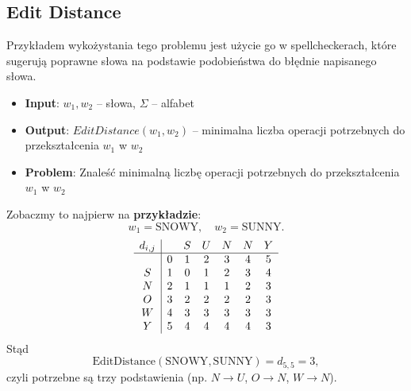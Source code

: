 \documentclass[11pt,a4paper]{article}
\begin{document}
\subsection{Edit Distance}
Przykładem wykożystania tego problemu jest użycie go w spellcheckerach, które sugerują poprawne słowa na podstawie podobieństwa do błędnie napisanego słowa.
\begin{itemize}
    \item \textbf{Input}: $w_1, w_2$ -- słowa, $\Sigma$ -- alfabet
    \item \textbf{Output}: $EditDistance(w_1, w_2)$ -- minimalna liczba operacji potrzebnych do przekształcenia $w_1$ w $w_2$
    \item \textbf{Problem}: Znaleść minimalną liczbę operacji potrzebnych do przekształcenia $w_1$ w $w_2$
\end{itemize}
Zobaczmy to najpierw na \textbf{przykładzie}:
\[
w_1=\text{SNOWY},\quad w_2=\text{SUNNY}.
\]
\[
\begin{array}{c|cccccc}
d_{i,j} &   & S & U & N & N & Y \\\hline
        & 0 & 1 & 2 & 3 & 4 & 5 \\
S       & 1 & 0 & 1 & 2 & 3 & 4 \\
N       & 2 & 1 & 1 & 1 & 2 & 3 \\
O       & 3 & 2 & 2 & 2 & 2 & 3 \\
W       & 4 & 3 & 3 & 3 & 3 & 3 \\
Y       & 5 & 4 & 4 & 4 & 4 & 3 \\
\end{array}
\]
Stąd
\[
\mathrm{EditDistance}(\text{SNOWY},\text{SUNNY}) = d_{5,5} = 3,
\]
czyli potrzebne są trzy podstawienia (np. \(N\to U\), \(O\to N\), \(W\to N\)).
\end{document}
